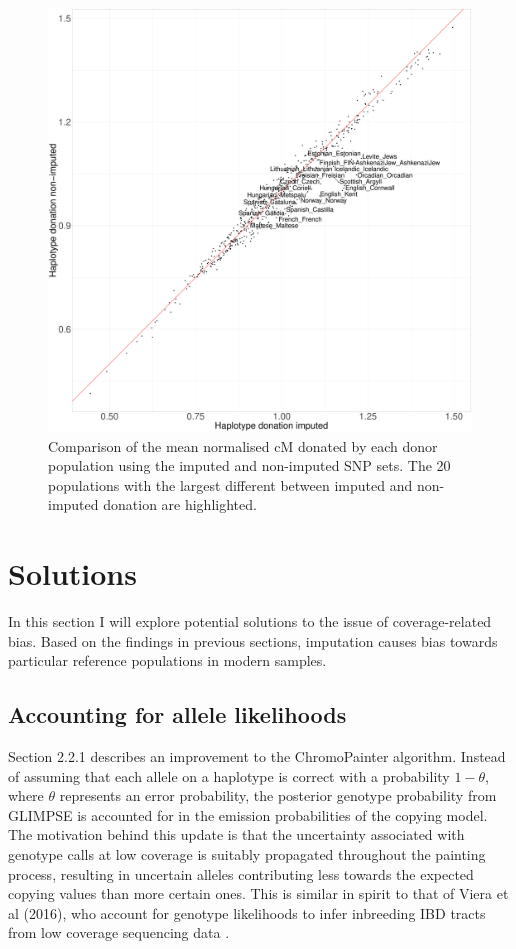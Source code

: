 \begin{figure}[htp]
    \centering
    \includegraphics[width=1.0\textwidth]{../images/chapter1/donation_imputed_nonimputed.pdf}
    \caption{Comparison of the mean normalised cM donated by each donor population using the imputed and non-imputed SNP sets. The 20 populations with the largest different between imputed and non-imputed donation are highlighted.}
    \label{fig:imputed_nonimputed_donation}
\end{figure}

\section{Solutions}

In this section I will explore potential solutions to the issue of coverage-related bias. Based on the findings in previous sections, imputation causes bias towards particular reference populations in modern samples.  

\subsection{Accounting for allele likelihoods}

Section 2.2.1 describes an improvement to the ChromoPainter algorithm. Instead of assuming that each allele on a haplotype is correct with a probability $1-\theta$, where $\theta$ represents an error probability, the posterior genotype probability from GLIMPSE is accounted for in the emission probabilities of the copying model. The motivation behind this update is that the uncertainty associated with genotype calls at low coverage is suitably propagated throughout the painting process, resulting in uncertain alleles contributing less towards the expected copying values than more certain ones. This is similar in spirit to that of Viera et al (2016), who account for genotype likelihoods to infer inbreeding IBD tracts from low coverage sequencing data \cite{vieira2016estimating}.


